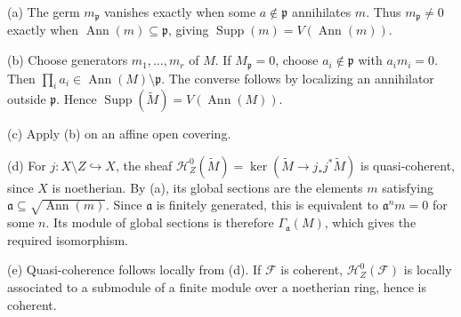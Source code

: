 (a) The germ $m_{\mathfrak p}$ vanishes exactly when some $a\notin\mathfrak p$ annihilates $m$. Thus $m_{\mathfrak p}\ne0$ exactly when $\operatorname{Ann}(m)\subseteq\mathfrak p$, giving $\operatorname{Supp}(m)=V(\operatorname{Ann}(m))$.

(b) Choose generators $m_1,\ldots,m_r$ of $M$. If $M_{\mathfrak p}=0$, choose $a_i\notin\mathfrak p$ with $a_im_i=0$. Then $\prod_i a_i\in\operatorname{Ann}(M)\setminus\mathfrak p$. The converse follows by localizing an annihilator outside $\mathfrak p$. Hence $\operatorname{Supp}(\widetilde M)=V(\operatorname{Ann}(M))$.

(c) Apply (b) on an affine open covering.

(d) For $j:X\setminus Z\hookrightarrow X$, the sheaf $\mathcal H_Z^0(\widetilde M)=\ker(\widetilde M\to j_*j^*\widetilde M)$ is quasi-coherent, since $X$ is noetherian. By (a), its global sections are the elements $m$ satisfying $\mathfrak a\subseteq\sqrt{\operatorname{Ann}(m)}$. Since $\mathfrak a$ is finitely generated, this is equivalent to $\mathfrak a^nm=0$ for some $n$. Its module of global sections is therefore $\Gamma_{\mathfrak a}(M)$, which gives the required isomorphism.

(e) Quasi-coherence follows locally from (d). If $\mathcal F$ is coherent, $\mathcal H_Z^0(\mathcal F)$ is locally associated to a submodule of a finite module over a noetherian ring, hence is coherent.
